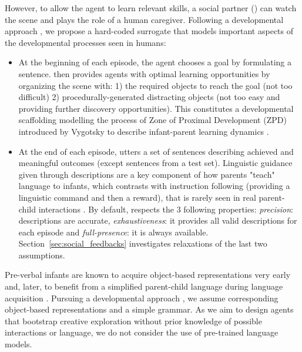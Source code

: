 However, to allow the agent to learn relevant skills, a social partner (\SP) can watch the scene and plays the role of a human caregiver. Following a developmental approach \cite{asada2009cognitive}, we propose a hard-coded surrogate \SP that models important aspects of the developmental processes seen in humans:
\begin{itemize}
    \item 
    At the beginning of each episode, the agent chooses a goal by formulating a sentence. \SP then provides agents with optimal learning opportunities by organizing the scene with: 1) the required objects to reach the goal (not too difficult) 2) procedurally-generated distracting objects (not too easy and providing further discovery opportunities). This constitutes a developmental scaffolding modelling the process of Zone of Proximal Development (ZPD) introduced by Vygotsky to describe infant-parent learning dynamics \cite{Vygotskii1978}. 
    \item 
    At the end of each episode, \SP utters a set of sentences describing achieved and meaningful outcomes (except sentences from a test set). Linguistic guidance given through descriptions are a key component of how parents "teach" language to infants, which contrasts with instruction following (providing a linguistic command and then a reward), that is rarely seen in real parent-child interactions \cite{tomasello2009constructing, bornstein1992maternal}. By default, \SP respects the $3$ following properties: \textit{precision}: descriptions are accurate, \textit{exhaustiveness}: it provides all valid descriptions for each episode and \textit{full-presence}: it is always available. Section~\ref{sec:social_feedbacks} investigates relaxations of the last two assumptions. 
\end{itemize}

Pre-verbal infants are known to acquire object-based representations very early \cite{spelke1992origins,johnson2003development} and, later, to benefit from a simplified parent-child language during language acquisition \cite{mintz2003frequent}. Pursuing a developmental approach \cite{asada2009cognitive}, we assume corresponding object-based representations and a simple grammar. As we aim to design agents that bootstrap creative exploration without prior knowledge of possible interactions or language, we do not consider the use of pre-trained language models.

